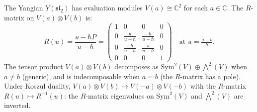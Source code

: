 \begin{example}
\label{ex:yangian-sl2-modules}
The Yangian $Y(\mathfrak{sl}_2)$ has evaluation modules
$V(a) \cong \mathbb{C}^2$ for each $a \in \mathbb{C}$.  The
$R$-matrix on $V(a) \otimes V(b)$ is:
\[
R(u) = \frac{u - \hbar P}{u - \hbar}
= \begin{pmatrix}
1 & 0 & 0 & 0 \\
0 & \frac{u}{u-\hbar} & \frac{-\hbar}{u-\hbar} & 0 \\
0 & \frac{-\hbar}{u-\hbar} & \frac{u}{u-\hbar} & 0 \\
0 & 0 & 0 & 1
\end{pmatrix}
\quad\text{at } u = \tfrac{a-b}{\hbar}.
\]
The tensor product $V(a) \otimes V(b)$ decomposes as
$\mathrm{Sym}^2(V) \oplus \bigwedge^2(V)$ when $a \neq b$
(generic), and is indecomposable when $a = b$ (the $R$-matrix
has a pole).  Under Koszul duality,
$V(a) \otimes V(b) \mapsto V(-a) \otimes V(-b)$ with the
$R$-matrix $R(u) \mapsto R^{-1}(u)$: the $R$-matrix eigenvalues
on $\mathrm{Sym}^2(V)$ and $\bigwedge^2(V)$ are inverted.
\end{example}

